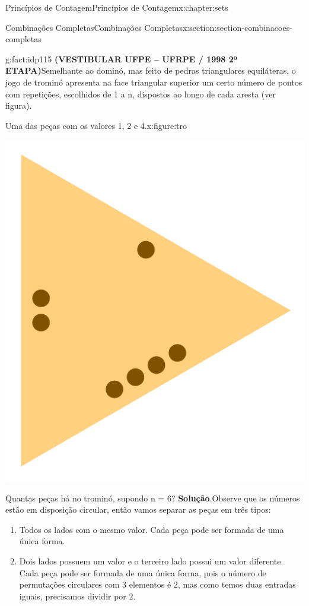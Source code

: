 \documentclass[oneside,10pt,]{book}
\newcommand{\blocktitlefont}{\relax}
\newcommand{\terminology}[1]{\textbf{#1}}
\numberwithin{equation}{section}
\begin{document}
\begin{chapterptx}{Princípios de Contagem}{}{Princípios de Contagem}{}{}{x:chapter:sets}
\begin{sectionptx}{Combinações Completas}{}{Combinações Completas}{}{}{x:section:section-combinacoes-completas}
\begin{fact}{}{}{g:fact:idp115}
\terminology{(VESTIBULAR UFPE – UFRPE \slash{} 1998 2ª ETAPA)}Semelhante ao dominó, mas feito de pedras triangulares equiláteras, o jogo de trominó apresenta na face triangular superior um certo número de pontos com repetições, escolhidos de 1 a n, dispostos ao longo de cada aresta (ver figura).%
\begin{figureptx}{Uma das peças com os valores 1, 2 e 4.}{x:figure:tro}{}%
\begin{image}{0.375}{0.25}{0.375}%
\includegraphics[width=\linewidth]{images/tro}
\end{image}%
\tcblower
\end{figureptx}%
Quantas peças há no trominó, supondo n = 6?%
\textbf{\blocktitlefont Solução}.\quad{}Observe que os números estão em disposição circular, então vamos separar as peças em três tipos:%
%
\begin{enumerate}
\item{}Todos os lados com o mesmo valor. Cada peça pode ser formada de uma única forma.%
\item{}Dois lados possuem um valor e o terceiro lado possui um valor diferente. Cada peça pode ser formada de uma única forma, pois o número de permutações circulares com 3 elementos é 2, mas como temos duas entradas iguais, precisamos dividir por 2.%

\end{enumerate}
\end{fact}
\end{sectionptx}
\end{chapterptx}
\end{document}
